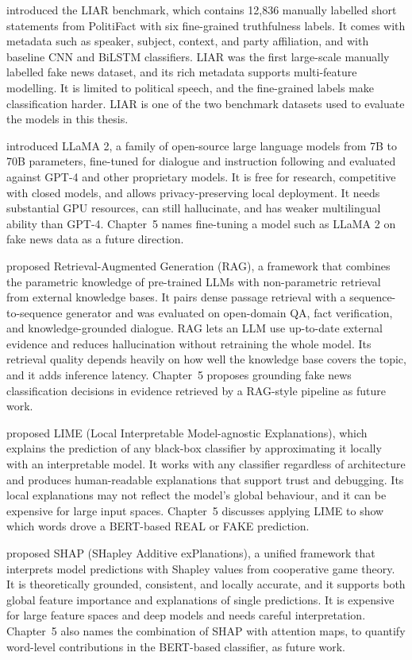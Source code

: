 \citep{Wang2017Liar} introduced the LIAR benchmark, which contains 12,836 manually labelled short statements from PolitiFact with six fine-grained truthfulness labels. It comes with metadata such as speaker, subject, context, and party affiliation, and with baseline CNN and BiLSTM classifiers. LIAR was the first large-scale manually labelled fake news dataset, and its rich metadata supports multi-feature modelling. It is limited to political speech, and the fine-grained labels make classification harder. LIAR is one of the two benchmark datasets used to evaluate the models in this thesis.

\citep{Touvron2023Llama2} introduced LLaMA 2, a family of open-source large language models from 7B to 70B parameters, fine-tuned for dialogue and instruction following and evaluated against GPT-4 and other proprietary models. It is free for research, competitive with closed models, and allows privacy-preserving local deployment. It needs substantial GPU resources, can still hallucinate, and has weaker multilingual ability than GPT-4. Chapter~5 names fine-tuning a model such as LLaMA 2 on fake news data as a future direction.

\citep{Lewis2020RAG} proposed Retrieval-Augmented Generation (RAG), a framework that combines the parametric knowledge of pre-trained LLMs with non-parametric retrieval from external knowledge bases. It pairs dense passage retrieval with a sequence-to-sequence generator and was evaluated on open-domain QA, fact verification, and knowledge-grounded dialogue. RAG lets an LLM use up-to-date external evidence and reduces hallucination without retraining the whole model. Its retrieval quality depends heavily on how well the knowledge base covers the topic, and it adds inference latency. Chapter~5 proposes grounding fake news classification decisions in evidence retrieved by a RAG-style pipeline as future work.

\citep{Ribeiro2016LIME} proposed LIME (Local Interpretable Model-agnostic Explanations), which explains the prediction of any black-box classifier by approximating it locally with an interpretable model. It works with any classifier regardless of architecture and produces human-readable explanations that support trust and debugging. Its local explanations may not reflect the model's global behaviour, and it can be expensive for large input spaces. Chapter~5 discusses applying LIME to show which words drove a BERT-based REAL or FAKE prediction.

\citep{Lundberg2017SHAP} proposed SHAP (SHapley Additive exPlanations), a unified framework that interprets model predictions with Shapley values from cooperative game theory. It is theoretically grounded, consistent, and locally accurate, and it supports both global feature importance and explanations of single predictions. It is expensive for large feature spaces and deep models and needs careful interpretation. Chapter~5 also names the combination of SHAP with attention maps, to quantify word-level contributions in the BERT-based classifier, as future work.

